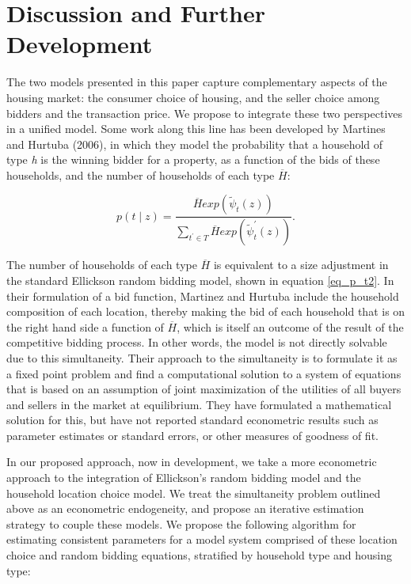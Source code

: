 \documentclass{article}
\begin{document}
\section{Discussion and Further Development}
\label{future-work}

The two models presented in this paper capture complementary aspects of the housing market:
the consumer choice of housing, and the seller choice among bidders and the transaction price.  We propose
to integrate these two perspectives in a unified model.  Some work along this line has been developed by
Martines and Hurtuba (2006), in which they model the probability that a household of type \emph{h} is the winning bidder for a property, as a function of the bids of these households, and
the number of households of each type $\overline{H}$:

\begin{equation}
\label{eq_p_t2}
p(t \mid z)=\frac{\overline{H} exp(\tilde{\psi}_t(z))}{\sum_{t^\prime \in T}{\overline{H} exp(\tilde{\psi}_t^\prime(z))}}.
\end{equation}

The number of households of each type $\overline{H}$ is equivalent to a size adjustment in the standard Ellickson
random bidding model, shown in equation \ref{eq_p_t2}.  In their formulation of a bid function, Martinez and Hurtuba include
the household composition of each location, thereby making the bid of each household that is on the right hand side a
function of $\overline{H}$, which is itself an outcome of the result of the competitive bidding process.  In other words, the
model is not directly solvable due to this simultaneity.  Their approach to the simultaneity is to formulate it as a fixed point problem
and find a computational solution to a system of equations that is based on an assumption of joint maximization of the utilities
of all buyers and sellers in the market at equilibrium.  They have formulated a mathematical solution for this, but
have not reported standard econometric results such as parameter estimates or standard errors, or other
measures of goodness of fit.

In our proposed approach, now in development, we take a more econometric approach
to the integration of Ellickson's random bidding model and the household location choice model.  We treat the simultaneity problem
outlined above as an econometric endogeneity, and propose an iterative estimation strategy to couple these models.  We propose the
following algorithm for estimating consistent parameters for a model system comprised of these location choice and random bidding
equations, stratified by household type and housing type:
\end{document}
